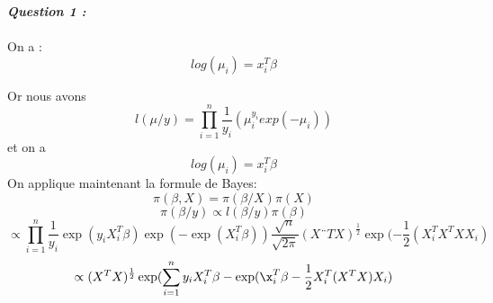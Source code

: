 \documentclass{article}
\newcommand{\<}{\langle}
\renewcommand{\>}{\rangle}
\theoremstyle{definition}
\begin{document}
\textbf{\textit{Question 1 : }} \\ \\

On a : $$ log(\mu_i)=x_i^T\beta$$

Or nous avons $$l(\mu/y)=\prod_{i=1}^n \frac{1}{y_i}(\mu_i^{y_i}exp(-\mu_i)) $$ 
et on a $$ log(\mu_i)=x_i^T\beta$$
On applique maintenant la formule de Bayes: 
$$\pi(\beta,X) = \pi(\beta/X)\pi(X)$$
$$\pi(\beta/y) \propto l(\beta/y)\pi(\beta) $$
$$\propto \prod_{i=1}^n \frac{1}{y_i} \exp(y_i X_i^T\beta)\exp(-\exp(X_i^T\beta))\frac{\sqrt{n}}{\sqrt{2\pi}} (X¨TX)^{\frac{1}{2}} \exp(-\frac{1}{2}(X_i^TX^TXX_i) $$
$$\propto (X^TX)^{\frac{1}{2}}\exp(\sum_{i=1}^n y_i X_i^T\beta-\exp(\x_i^T\beta-\frac{1}{2}X_i^T(X^TX)X_i)$$
\end{document}
